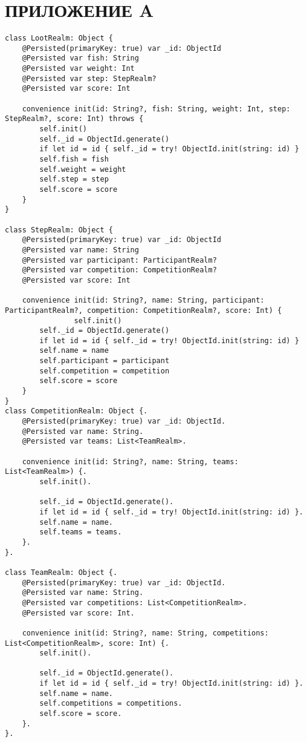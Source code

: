 \section{ПРИЛОЖЕНИЕ A} \label{ПРИЛОЖЕНИЕ A}

\begin{lstlisting}[label=lst:code1, caption=Создание спроектированной базы данных]
class LootRealm: Object {
	@Persisted(primaryKey: true) var _id: ObjectId
	@Persisted var fish: String
	@Persisted var weight: Int
	@Persisted var step: StepRealm?
	@Persisted var score: Int
    
	convenience init(id: String?, fish: String, weight: Int, step: StepRealm?, score: Int) throws {
		self.init()
		self._id = ObjectId.generate()
		if let id = id { self._id = try! ObjectId.init(string: id) }
		self.fish = fish
		self.weight = weight
		self.step = step
		self.score = score
	}
}
	
class StepRealm: Object {
	@Persisted(primaryKey: true) var _id: ObjectId
	@Persisted var name: String
	@Persisted var participant: ParticipantRealm?
	@Persisted var competition: CompetitionRealm?
	@Persisted var score: Int
	
	convenience init(id: String?, name: String, participant: ParticipantRealm?, competition: CompetitionRealm?, score: Int) {
        		self.init()
		self._id = ObjectId.generate()
		if let id = id { self._id = try! ObjectId.init(string: id) }
		self.name = name
		self.participant = participant
		self.competition = competition
		self.score = score
	}
}
class CompetitionRealm: Object {.
	@Persisted(primaryKey: true) var _id: ObjectId.
	@Persisted var name: String.
	@Persisted var teams: List<TeamRealm>.
		
	convenience init(id: String?, name: String, teams: List<TeamRealm>) {.
		self.init().
        
		self._id = ObjectId.generate().
		if let id = id { self._id = try! ObjectId.init(string: id) }.
		self.name = name.
		self.teams = teams.
	}.
}.

class TeamRealm: Object {.
	@Persisted(primaryKey: true) var _id: ObjectId.
	@Persisted var name: String.
	@Persisted var competitions: List<CompetitionRealm>.
	@Persisted var score: Int.
    
	convenience init(id: String?, name: String, competitions: List<CompetitionRealm>, score: Int) {.
		self.init().
        
		self._id = ObjectId.generate().
		if let id = id { self._id = try! ObjectId.init(string: id) }.
		self.name = name.
		self.competitions = competitions.
		self.score = score.
	}.
}.
	

\end{lstlisting}
